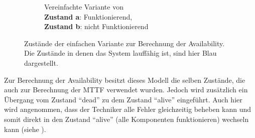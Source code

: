 \documentclass[
            a4paper
            ]{scrartcl}%
\begin{document}
\begin{figure}
\begin{subfigure}[b]{0.48\linewidth}
            \caption{Vereinfachte Variante von  \\
                \textbf{Zustand a}: Funktionierend, \\
                \textbf{Zustand b}: nicht Funktionierend}
            \label{fig:states_simple_avail_simply}
    \end{subfigure}
    \caption{Zustände der einfachen Variante zur Berechnung der Availability.\\
        Die Zustände in denen das System lauffähig ist, sind hier Blau
    dargestellt.}
    \label{fig:states_simple_avail_comb}
\end{figure}
Zur Berechnung der Availability besitzt dieses Modell die selben Zustände, die
auch zur Berechnung der MTTF verwendet wurden. Jedoch wird zusätzlich ein
Übergang vom Zustand \enquote{dead} zu dem Zustand \enquote{alive} eingeführt.
Auch hier wird angenommen, dass der Techniker alle Fehler gleichzeitig beheben
kann und somit direkt in den Zustand \enquote{alive} (alle Komponenten
funktionieren) wechseln kann (siehe ).
\end{document}
